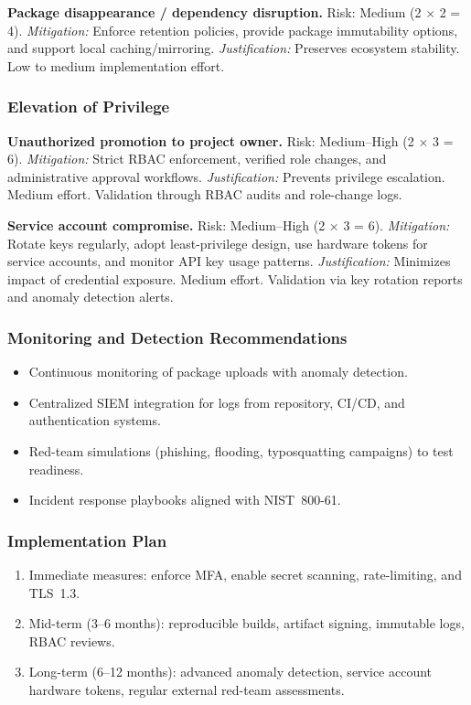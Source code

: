 \documentclass[letterpaper,12pt]{report}
\begin{document}
\textbf{Package disappearance / dependency disruption.}  
Risk: Medium (2 $\times$ 2 = 4).  
\emph{Mitigation:} Enforce retention policies, provide package immutability options, and 
support local caching/mirroring.  
\emph{Justification:} Preserves ecosystem stability. Low to medium implementation effort.  

\subsubsection*{Elevation of Privilege}

\textbf{Unauthorized promotion to project owner.}  
Risk: Medium--High (2 $\times$ 3 = 6).  
\emph{Mitigation:} Strict RBAC enforcement, verified role changes, and administrative 
approval workflows.  
\emph{Justification:} Prevents privilege escalation. Medium effort. Validation through RBAC 
audits and role-change logs.  

\textbf{Service account compromise.}  
Risk: Medium--High (2 $\times$ 3 = 6).  
\emph{Mitigation:} Rotate keys regularly, adopt least-privilege design, use hardware tokens 
for service accounts, and monitor API key usage patterns.  
\emph{Justification:} Minimizes impact of credential exposure. Medium effort. Validation via 
key rotation reports and anomaly detection alerts.  

\subsubsection*{Monitoring and Detection Recommendations}

\begin{itemize}
    \item Continuous monitoring of package uploads with anomaly detection.  
    \item Centralized SIEM integration for logs from repository, CI/CD, and authentication systems.  
    \item Red-team simulations (phishing, flooding, typosquatting campaigns) to test readiness.  
    \item Incident response playbooks aligned with NIST~800-61.  
\end{itemize}

\subsubsection*{Implementation Plan}

\begin{enumerate}
    \item Immediate measures: enforce MFA, enable secret scanning, rate-limiting, and TLS~1.3.  
    \item Mid-term (3--6 months): reproducible builds, artifact signing, immutable logs, RBAC reviews.  
    \item Long-term (6--12 months): advanced anomaly detection, service account hardware tokens, 
    regular external red-team assessments.  
\end{enumerate}
\end{document}
